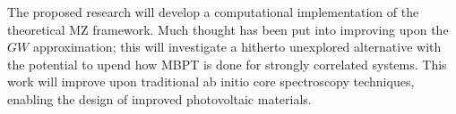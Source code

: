 The proposed research will develop a computational implementation of the theoretical MZ framework. Much thought has been put into improving upon the $GW$ approximation; this will investigate a hitherto unexplored alternative with the potential to upend how MBPT is done for strongly correlated systems. This work will improve upon traditional ab initio core spectroscopy techniques, enabling the design of improved photovoltaic materials.